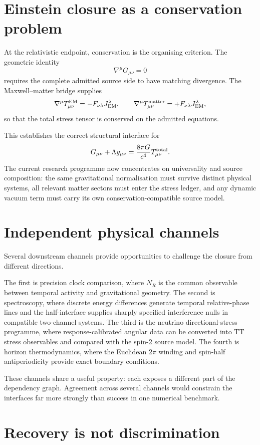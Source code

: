 \section{Einstein closure as a conservation problem}

At the relativistic endpoint, conservation is the organising criterion. The geometric identity
\[
\nabla^\mu G_{\mu\nu}=0
\]
requires the complete admitted source side to have matching divergence. The Maxwell--matter bridge supplies
\[
\nabla^\mu T^{\rm EM}_{\mu\nu}
=-F_{\nu\lambda}J_{\rm EM}^{\lambda},
\qquad
\nabla^\mu T^{\rm matter}_{\mu\nu}
=+F_{\nu\lambda}J_{\rm EM}^{\lambda},
\]
so that the total stress tensor is conserved on the admitted equations.

This establishes the correct structural interface for
\[
G_{\mu\nu}+\Lambda g_{\mu\nu}
=
\frac{8\pi G}{c^4}T^{\rm total}_{\mu\nu}.
\]
The current research programme now concentrates on universality and source composition: the same gravitational normalisation must survive distinct physical systems, all relevant matter sectors must enter the stress ledger, and any dynamic vacuum term must carry its own conservation-compatible source model.

\section{Independent physical channels}

Several downstream channels provide opportunities to challenge the closure from different directions.

The first is precision clock comparison, where \(N_R\) is the common observable between temporal activity and gravitational geometry. The second is spectroscopy, where discrete energy differences generate temporal relative-phase lines and the half-interface supplies sharply specified interference nulls in compatible two-channel systems. The third is the neutrino directional-stress programme, where response-calibrated angular data can be converted into TT stress observables and compared with the spin-2 source model. The fourth is horizon thermodynamics, where the Euclidean \(2\pi\) winding and spin-half antiperiodicity provide exact boundary conditions.

These channels share a useful property: each exposes a different part of the dependency graph. Agreement across several channels would constrain the interfaces far more strongly than success in one numerical benchmark.

\section{Recovery is not discrimination}


